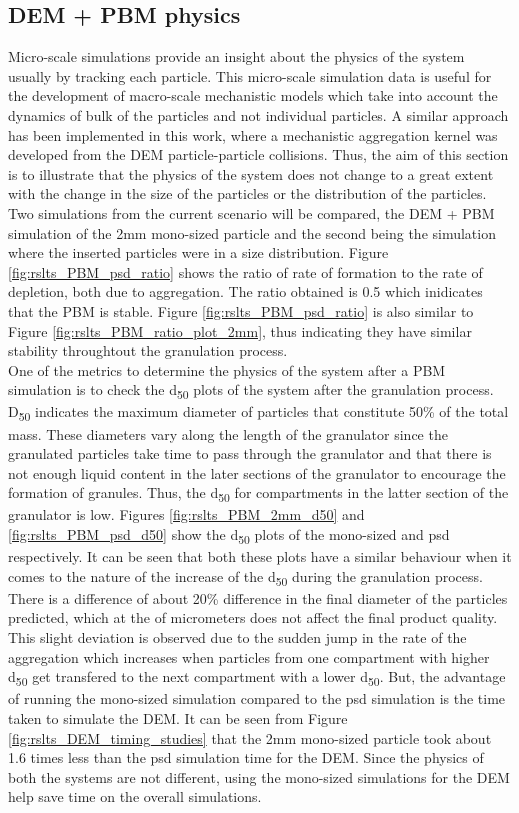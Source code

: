 \documentclass[preprint,11pt,authoryear]{elsarticle}
\begin{document}
\subsection{DEM + PBM physics}
\par Micro-scale simulations provide an insight about the physics of the system usually by tracking 
each particle. This micro-scale simulation data is useful for the development of macro-scale 
mechanistic models which take into account the dynamics of bulk of the particles and not individual 
particles. A similar approach has been implemented in this work, where a mechanistic aggregation 
kernel was developed from the DEM particle-particle collisions. Thus, the aim of this section is to 
illustrate that the physics of the system does not change to a great extent with the change in the size 
of the particles or the distribution of the particles.\\
Two simulations from the current scenario will be compared, the DEM + PBM simulation of the 2mm 
mono-sized particle and the second being the simulation where the inserted particles were in a size 
distribution. Figure \ref{fig:rslts_PBM_psd_ratio} shows the ratio of rate of formation to the rate of 
depletion, both due to aggregation. The ratio obtained is 0.5 which inidicates that the PBM is stable. 
Figure \ref{fig:rslts_PBM_psd_ratio} is also similar to Figure \ref{fig:rslts_PBM_ratio_plot_2mm}, thus 
indicating they have similar stability throughtout the granulation process. \\
One of the metrics to determine the physics of the system after a PBM simulation is to check the 
d\textsubscript{50} plots of the system after the granulation process. D\textsubscript{50} indicates the 
maximum diameter of particles that constitute 50\% of the total mass. These diameters vary along the 
length of the granulator since the granulated particles take time to pass through the granulator and 
that there is not enough liquid content in the later sections of the granulator to encourage the 
formation of granules. Thus, the d\textsubscript{50} for compartments in the latter section of the 
granulator is low. Figures \ref{fig:rslts_PBM_2mm_d50} and \ref{fig:rslts_PBM_psd_d50} show the 
d\textsubscript{50} plots of the mono-sized and psd respectively. It can be seen that both these plots 
have a similar behaviour when it comes to the nature of the increase of the d\textsubscript{50} during 
the granulation process. There is a difference of about 20\% difference in the final diameter of the 
particles predicted, which at the of micrometers does not affect the final product quality. This slight 
deviation is observed due to the sudden jump in the rate of the aggregation which increases when 
particles from one compartment with higher d\textsubscript{50} get transfered to the next 
compartment with a lower d\textsubscript{50}. But, the advantage of running the mono-sized 
simulation compared to the psd simulation is the time taken to simulate the DEM. It can be seen from 
Figure \ref{fig:rslts_DEM_timing_studies} that the 2mm mono-sized particle took about 1.6 times less 
than the psd simulation time for the DEM. Since the physics of both the systems are not different, 
using the mono-sized simulations for the DEM help save time on the overall simulations. 
\end{document}

